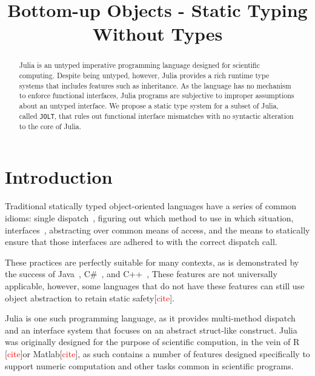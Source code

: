 \documentclass[preprint]{sigplanconf}
\newcommand{\xt}[1]{\texttt{#1}}
\newcommand{\jolt}{\xt{JOLT}}
\begin{document}
\title{Bottom-up Objects - Static Typing Without Types} 
\maketitle

\begin{abstract}
Julia is an untyped imperative programming language designed for scientific computing. 
Despite being untyped, however, Julia provides a rich runtime type systems that includes features such as  
inheritance. As the language has no mechanism to enforce functional interfaces, Julia programs 
are subjective to improper assumptions about an untyped interface. We propose a static type system for a 
subset of Julia, called \jolt, that rules out functional interface mismatches
with no syntactic alteration to the core of Julia.
\end{abstract}


\section{Introduction}

Traditional statically typed object-oriented languages have a series of
common idioms: single dispatch~\cite{jls}, figuring out which method
to use in which situation, interfaces~\cite{objinter, fj}, abstracting over 
common means of access, and the means to statically
ensure that those interfaces are adhered to with the correct dispatch call.

These practices are perfectly suitable for many contexts,
as is demonstrated by the success of Java~\cite{jls}, C\#~\cite{csls}, and C++~\cite{cppls}, 
These features are not universally applicable, however, some languages that do not have these features
can still use object abstraction to retain static safety[\textcolor{red}{cite}].

Julia is one such programming language, as it provides multi-method dispatch 
and an interface system that focuses on an abstract struct-like construct. 
Julia was originally designed for the purpose of scientific compution, in the vein of 
R [\textcolor{red}{cite}]or Matlab[\textcolor{red}{cite}], as such contains a number of features designed specifically to support 
numeric computation and other tasks common in scientific programs.
\end{document}
